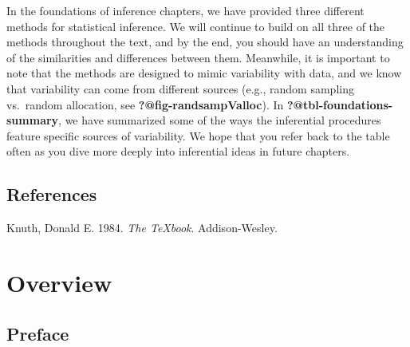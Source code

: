 \documentclass[
  letterpaper,
  DIV=11,
  numbers=noendperiod]{scrreprt}
\newlength{\cslhangindent}
\newenvironment{CSLReferences}[2] %
 {\begin{list}{}{%
  \setlength{\itemindent}{0pt}
  \setlength{\leftmargin}{0pt}
  \setlength{\parsep}{0pt}
  \ifodd #1
   \setlength{\leftmargin}{\cslhangindent}
   \setlength{\itemindent}{-1\cslhangindent}
  \fi
  \setlength{\itemsep}{#2\baselineskip}}}
 {\end{list}}
\begin{document}
\begin{tcolorbox}[enhanced jigsaw, colframe=quarto-callout-tip-color-frame, leftrule=.75mm, breakable, toprule=.15mm, arc=.35mm, rightrule=.15mm, colback=white, opacityback=0, bottomrule=.15mm, left=2mm]
\begin{minipage}[t]{5.5mm}
\textcolor{quarto-callout-tip-color}{\faLightbulb}
\end{minipage}%
\begin{minipage}[t]{\textwidth - 5.5mm}

In the foundations of inference chapters, we have provided three
different methods for statistical inference. We will continue to build
on all three of the methods throughout the text, and by the end, you
should have an understanding of the similarities and differences between
them. Meanwhile, it is important to note that the methods are designed
to mimic variability with data, and we know that variability can come
from different sources (e.g., random sampling vs.~random allocation, see
\textbf{?@fig-randsampValloc}). In \textbf{?@tbl-foundations-summary},
we have summarized some of the ways the inferential procedures feature
specific sources of variability. We hope that you refer back to the
table often as you dive more deeply into inferential ideas in future
chapters.

\end{minipage}%
\end{tcolorbox}


\chapter*{References}\label{references}


\label{refs}
\begin{CSLReferences}{1}{0}
Knuth, Donald E. 1984. \emph{The TeXbook}. Addison-Wesley.

\end{CSLReferences}

\part{Overview}

\chapter*{Preface}\label{preface-1}
\end{document}
